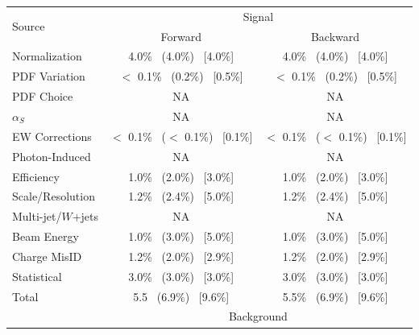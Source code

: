     \begin {table}[h]
        \begin{center}
        \begin{tabular}{ | l | c c | } 
            \hline
            \multirow{2}{*}{Source} & \multicolumn{2}{c|}{Signal}                                      \\
                                & Forward                           & Backward                        \\
            \hline
            Normalization       & 4.0\% ~(4.0\%) ~[4.0\%]           & 4.0\% ~(4.0\%) ~[4.0\%]         \\
            PDF Variation       & $<$ 0.1\% ~(0.2\%) ~[0.5\%]       & $<$ 0.1\% ~(0.2\%) ~[0.5\%]     \\
            PDF Choice          & NA                                & NA                              \\
            $\alpha_S$          & NA                                & NA                              \\
            EW Corrections      & $<$ 0.1\% ~($<$ 0.1\%) ~[0.1\%]   & $<$ 0.1\% ~($<$ 0.1\%) ~[0.1\%] \\
            Photon-Induced      & NA                                & NA                              \\
            Efficiency          & 1.0\% ~(2.0\%) ~[3.0\%]           & 1.0\% ~(2.0\%) ~[3.0\%]         \\
            Scale/Resolution    & 1.2\% ~(2.4\%) ~[5.0\%]           & 1.2\% ~(2.4\%) ~[5.0\%]         \\
            Multi-jet/$W$+jets  & NA                                & NA                              \\
            Beam Energy         & 1.0\% ~(3.0\%) ~[5.0\%]           & 1.0\% ~(3.0\%) ~[5.0\%]         \\
            Charge MisID        & 1.2\% ~(2.0\%) ~[2.9\%]           &  1.2\% ~(2.0\%) ~[2.9\%]        \\
            Statistical         & 3.0\% ~(3.0\%) ~[3.0\%]           & 3.0\% ~(3.0\%) ~[3.0\%]         \\
            \hline  
            Total               & 5.5 ~(6.9\%) ~[9.6\%]             & 5.5\% ~(6.9\%) ~[9.6\%]        \\
            \hline
            \hline
                                & \multicolumn{2}{c|}{Background}                                    \\

\end{tabular}
\end{center}
\end{table}
